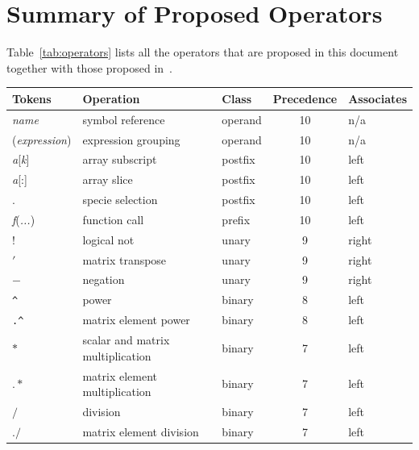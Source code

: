 \documentclass{cekarticle}
\begin{document}
\section{Summary of Proposed Operators}
\label{sec:operators} Table~\ref{tab:operators} lists all the
operators that are proposed in this document together with those
proposed in~\citet{finney:2002c}.
\begin{table}[tbh]
  \vspace*{8pt}
  \begin{center}
    \begin{tabular}{lllcl}
      \toprule
      \textbf{Tokens} & \textbf{Operation} & \textbf{Class} & \textbf{Precedence} & \textbf{Associates} \\
      \midrule
      \emph{name} & symbol reference & operand & 10 & n/a \\
      (\emph{expression}) & expression grouping & operand & 10 & n/a\\
      \color{red} \emph{a}[\emph{k}] & \color{red} array subscript & \color{red} postfix & \color{red} 10 & \color{red} left\\
      \color{red} \emph{a}[:] & \color{red} array slice & \color{red} postfix & \color{red} 10 & \color{red} left\\
      \color{red} . & \color{red} specie selection & \color{red} postfix & \color{red} 10 & \color{red} left\\
      \emph{f}(\emph{...}) & function call & prefix & 10 & left\\
      \color{green} $!$ & \color{green} logical not & \color{green} unary & \color{green} 9 & \color{green} right\\
      \color{red} $'$ & \color{red} matrix transpose & \color{red} unary & \color{red} 9 & \color{red} right\\
      $-$ & negation & unary & 9 & right\\
      \verb|^| & power & binary & 8 & left \\
      \color{red} \verb|.^| & \color{red} matrix element power & \color{red} binary & \color{red} 8 & \color{red} left\\
      $*$ & scalar and matrix multiplication & binary & 7 & left\\
      \color{red} $.*$ & \color{red} matrix element multiplication & \color{red} binary & \color{red} 7 & \color{red} left\\
      $/$ & division & binary & 7 & left\\
      \color{red} $./$ & \color{red} matrix element division & \color{red} binary & \color{red} 7 & \color{red} left\\

\end{tabular}
\end{center}
\end{table}
\end{document}
